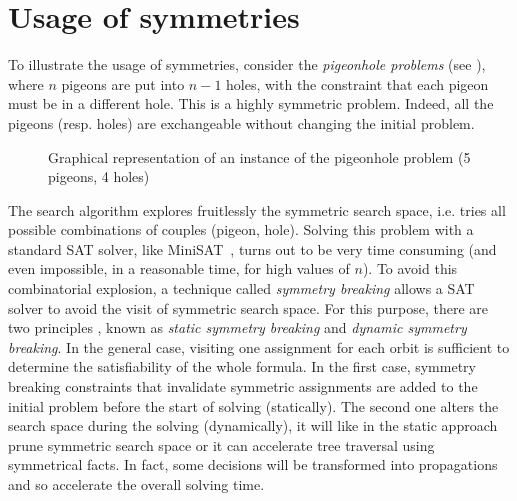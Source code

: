  \clearpage
 
\section{Usage of symmetries}

To illustrate the usage of symmetries, consider the \textit{pigeonhole problems} (see ), where $n$ pigeons are put into $n-1$ holes, with the constraint that each pigeon must be in a different hole. This is a
highly symmetric problem. Indeed, all the pigeons (resp. holes) are exchangeable
without changing the initial problem.
\begin{figure}[!htbp]
 \centering
 \caption{Graphical representation of an instance of the pigeonhole problem (5 pigeons, 4 holes)}
 \label{fig:hole}
\end{figure}
The search algorithm explores
fruitlessly the symmetric search space, i.e. tries all possible combinations of couples (pigeon, hole).
Solving this problem with a standard SAT solver, like MiniSAT~\cite{een2003extensible},
 turns out to be very time consuming (and even impossible, in a reasonable time, for high values of $n$). 
To avoid this combinatorial explosion, a technique called \emph{symmetry breaking} allows a SAT solver to avoid the visit of symmetric search space. For this purpose, there are two principles , known as \emph{static symmetry breaking}
and \emph{dynamic symmetry breaking}. In the general case, visiting one assignment for each orbit is sufficient to determine the satisfiability of the whole formula.
In the first case, symmetry breaking constraints that invalidate symmetric assignments are added to the initial problem before the start of solving (statically). The second one alters
the search space during the solving (dynamically), it will like in the static approach prune symmetric search space or it can accelerate tree traversal using symmetrical facts.
In fact, some decisions will be transformed into propagations and so accelerate the overall solving time.
  
